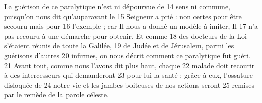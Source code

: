 La guérison de ce paralytique n'est ni dépourvue de	 
14	 	sens ni commune, puisqu'on nous dit qu'auparavant le	 
15	 	Seigneur a prié : non certes pour être secouru mais pour	 
16	 	l'exemple ; car Il nous a donné un modèle à imiter, Il	 
17	 	n'a pas recouru à une démarche pour obtenir. Et comme	 
18	 	des docteurs de la Loi s'étaient réunis de toute la Galilée,	 
19	 	de Judée et de Jérusalem, parmi les guérisons d'autres	 
20	 	infirmes, on nous décrit comment ce paralytique fut guéri.	 
21	 	Avant tout, comme nous l'avons dit plus haut, chaque	 
22	 	malade doit recourir à des intercesseurs qui demanderont	 
23	 	pour lui la santé : grâce à eux, l'ossature disloquée de	 
24	 	notre vie et les jambes boiteuses de nos actions seront	 
25	 	remises par le remède de la parole céleste.